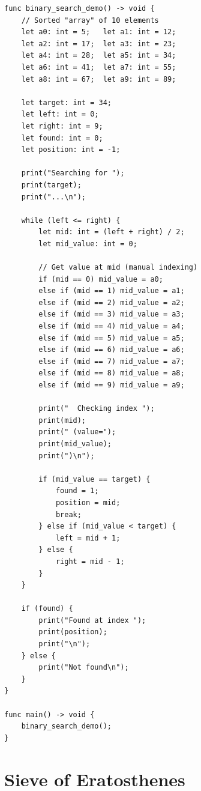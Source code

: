 \documentclass[12pt,a4paper,oneside]{book}
\begin{document}
\begin{lstlisting}[style=algo, caption={Binary Search (Simulated)}]
func binary_search_demo() -> void {
    // Sorted "array" of 10 elements
    let a0: int = 5;   let a1: int = 12;
    let a2: int = 17;  let a3: int = 23;
    let a4: int = 28;  let a5: int = 34;
    let a6: int = 41;  let a7: int = 55;
    let a8: int = 67;  let a9: int = 89;
    
    let target: int = 34;
    let left: int = 0;
    let right: int = 9;
    let found: int = 0;
    let position: int = -1;
    
    print("Searching for ");
    print(target);
    print("...\n");
    
    while (left <= right) {
        let mid: int = (left + right) / 2;
        let mid_value: int = 0;
        
        // Get value at mid (manual indexing)
        if (mid == 0) mid_value = a0;
        else if (mid == 1) mid_value = a1;
        else if (mid == 2) mid_value = a2;
        else if (mid == 3) mid_value = a3;
        else if (mid == 4) mid_value = a4;
        else if (mid == 5) mid_value = a5;
        else if (mid == 6) mid_value = a6;
        else if (mid == 7) mid_value = a7;
        else if (mid == 8) mid_value = a8;
        else if (mid == 9) mid_value = a9;
        
        print("  Checking index ");
        print(mid);
        print(" (value=");
        print(mid_value);
        print(")\n");
        
        if (mid_value == target) {
            found = 1;
            position = mid;
            break;
        } else if (mid_value < target) {
            left = mid + 1;
        } else {
            right = mid - 1;
        }
    }
    
    if (found) {
        print("Found at index ");
        print(position);
        print("\n");
    } else {
        print("Not found\n");
    }
}

func main() -> void {
    binary_search_demo();
}
\end{lstlisting}

\section{Sieve of Eratosthenes}
\end{document}
